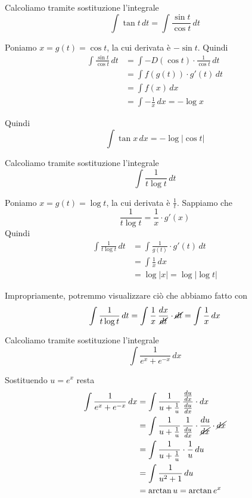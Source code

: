 \begin{example}
Calcoliamo tramite sostituzione l'integrale
\begin{equation*}
\int \tan t \, dt = \int \frac{\sin t}{\cos t} \, dt
\end{equation*}

Poniamo $x = g(t) = \cos t$, la cui derivata è $-\sin t$. Quindi
\begin{align*}
\int \frac{\sin t}{\cos t} \, dt &= \int -D(\cos t) \cdot \frac{1}{\cos t} \, dt \\
&= \int f(g(t)) \cdot g'(t) \, dt \\
&= \int f(x) \, dx \\
&= \int -\frac{1}{x} \, dx = -\log x
\end{align*}

Quindi
\begin{equation*}
\int \tan x \, dx = - \log|\cos t|
\end{equation*}
\end{example}

\begin{example}
Calcoliamo tramite sostituzione l'integrale
\begin{equation*}
\int \frac{1}{t\log t} \, dt
\end{equation*}

Poniamo $x = g(t) = \log t$, la cui derivata è $\frac{1}{t}$. Sappiamo che
\begin{equation*}
\frac{1}{t \log t} = \frac{1}{x} \cdot g'(x)
\end{equation*}
Quindi
\begin{align*}
\int \frac{1}{t\log t} \, dt &= \int \frac{1}{g(t)} \cdot g'(t) \, dt \\
&= \int \frac{1}{x} \, dx \\
&= \log |x| = \log |\log t|
\end{align*}

Impropriamente, potremmo visualizzare ciò che abbiamo fatto con
\begin{equation*}
\int \frac{1}{t\log t} \, dt = \int \frac{1}{x} \, \frac{dx}{\cancel{dt}} \cdot \cancel{dt} = \int \frac{1}{x} \, dx
\end{equation*}
\end{example}

\begin{example}
Calcoliamo tramite sostituzione l'integrale
\begin{equation*}
\int \frac{1}{e^x + e^{-x}} \, dx
\end{equation*}

Sostituendo $u = e^x$ resta
\begin{align*}
\int \frac{1}{e^x + e^{-x}} \, dx &= \int \frac{1}{u+\frac{1}{u}} \, \frac{\frac{du}{dx}}{\frac{du}{dx}} \cdot dx \\
&= \int \frac{1}{u+\frac{1}{u}} \, \frac{1}{\frac{du}{dx}} \cdot \frac{du}{\cancel{dx}} \cdot \cancel{dx} \\
&= \int \frac{1}{u+\frac{1}{u}} \cdot \frac{1}{u} \, du \\
&= \int \frac{1}{u^2 + 1} \, du \\
&= \arctan u = \arctan e^x
\end{align*}
\end{example}
